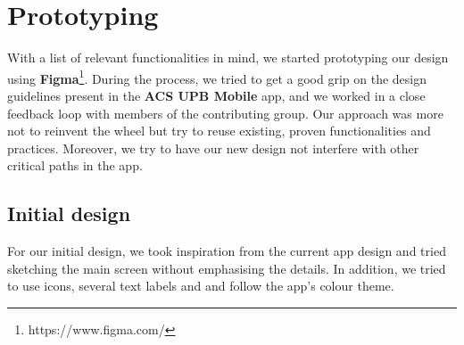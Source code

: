 \section{Prototyping} \label{4:prototyping}

With a list of relevant functionalities in mind, we started prototyping our design using \textbf{Figma}\footnote{https://www.figma.com/}. During the process, we tried to get a good grip on the design guidelines present in the \textbf{ACS UPB Mobile} app, and we worked in a close feedback loop with members of the contributing group. Our approach was more not to reinvent the wheel but try to reuse existing, proven functionalities and practices. Moreover, we try to have our new design not interfere with other critical paths in the app.


\subsection{Initial design} \label{4:initial_design}

For our initial design, we took inspiration from the current app design and tried sketching the main screen without emphasising the details. In addition, we tried to use icons, several text labels and and follow the app's colour theme.

